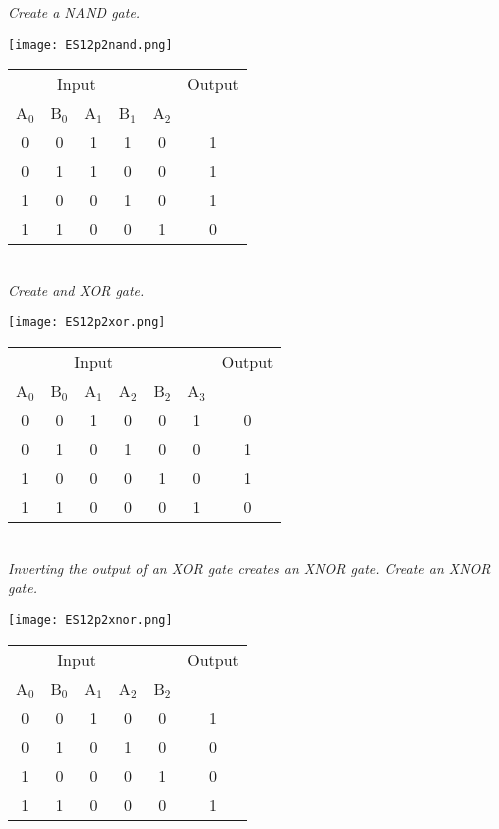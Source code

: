 \documentclass[a4paper,man,natbib]{apa6}
\begin{document}
\emph{Create a NAND gate.} \\
		\begin{minipage}{2.5in}
		\texttt{[image: ES12p2nand.png]}
	\end{minipage}
	\begin{minipage}{2.5in}
		\begin{tabular}{ c c | c c c | c }
			\multicolumn{4}{c}{Input} & & Output \\
			A$_{0}$ & B$_{0}$ & A$_{1}$ & B$_{1}$ & A$_{2}$ & \\
			\hline
			0 & 0 & 1 & 1 & 0 & 1 \\
			0 & 1 & 1 & 0 & 0 & 1 \\
			1 & 0 & 0 & 1 & 0 & 1 \\
			1 & 1 & 0 & 0 & 1 & 0 \\
		\end{tabular}
	\end{minipage} ~\\
\emph{Create and XOR gate.} \\
	\begin{minipage}{2.5in}
		\texttt{[image: ES12p2xor.png]}
	\end{minipage}
	\begin{minipage}{2.5in}
		\begin{tabular}{ c c | c c c c | c }
			\multicolumn{5}{c}{Input} & & Output \\
			A$_{0}$ & B$_{0}$ & A$_{1}$ & A$_{2}$ & B$_{2}$ & A$_{3}$ & \\
			\hline
			0 & 0 & 1 & 0 & 0 & 1 & 0 \\
			0 & 1 & 0 & 1 & 0 & 0 & 1 \\
			1 & 0 & 0 & 0 & 1 & 0 & 1 \\
			1 & 1 & 0 & 0 & 0 & 1 & 0 \\
		\end{tabular}
	\end{minipage} ~\\
\emph{Inverting the output of an XOR gate creates an XNOR gate.  Create an XNOR gate.} \\
	\begin{minipage}{2.5in}
		\texttt{[image: ES12p2xnor.png]}
	\end{minipage}
	\begin{minipage}{2.5in}
		\begin{tabular}{ c c | c c c | c }
			\multicolumn{4}{c}{Input} & & Output \\
			A$_{0}$ & B$_{0}$ & A$_{1}$ & A$_{2}$ & B$_{2}$ & \\
			\hline
			0 & 0 & 1 & 0 & 0 & 1 \\
			0 & 1 & 0 & 1 & 0 & 0 \\
			1 & 0 & 0 & 0 & 1 & 0 \\
			1 & 1 & 0 & 0 & 0 & 1 \\
		\end{tabular}
	\end{minipage} ~\\

\nocite{warford10}

\end{document}
